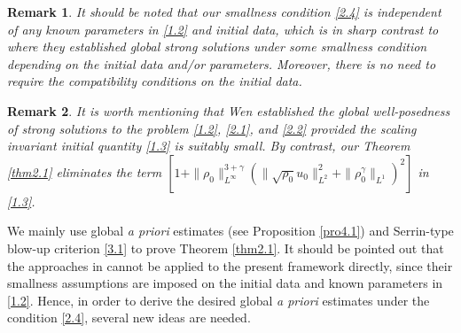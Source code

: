 \documentclass[11pt]{article}
\newtheorem{Remark}{Remark}[section]
\begin{document}
\begin{Remark}
It should be noted that our smallness condition \eqref{2.4} is independent of any known parameters in \eqref{1.2} and initial data, which is in sharp contrast to \cite{DM23,HLX2012,HP24,W2025} where they established global strong solutions under some smallness condition depending on the initial data and/or parameters. Moreover, there is no need to require the compatibility conditions on the initial data.
\end{Remark}

\begin{Remark}
It is worth mentioning that Wen \cite{W2025} established the global well-posedness of strong solutions to the problem \eqref{1.2}, \eqref{2.1}, and \eqref{2.2} provided the scaling invariant initial quantity \eqref{1.3} is suitably small. By contrast, our Theorem \ref{thm2.1} eliminates the term $\left[1 + \|\rho_0\|_{L^{\infty }}^{3 + \gamma} \left( \|\sqrt{\rho_0} u_0\|_{L^2}^2 + \|\rho_0^{\gamma}\|_{L^1} \right)^2 \right]$ in \eqref{1.3}.
\end{Remark}

We mainly use global {\it a priori} estimates (see Proposition \ref{pro4.1}) and Serrin-type blow-up criterion \eqref{3.1} to prove Theorem \ref{thm2.1}. It should be pointed out that the approaches in \cite{DM23,HLX2012,HP24,W2025} cannot be applied to the present framework directly, since their smallness assumptions are imposed on the initial data and known parameters in \eqref{1.2}. Hence, in order to derive the desired global \emph{a priori} estimates under the condition \eqref{2.4}, several new ideas are needed.
\end{document}
